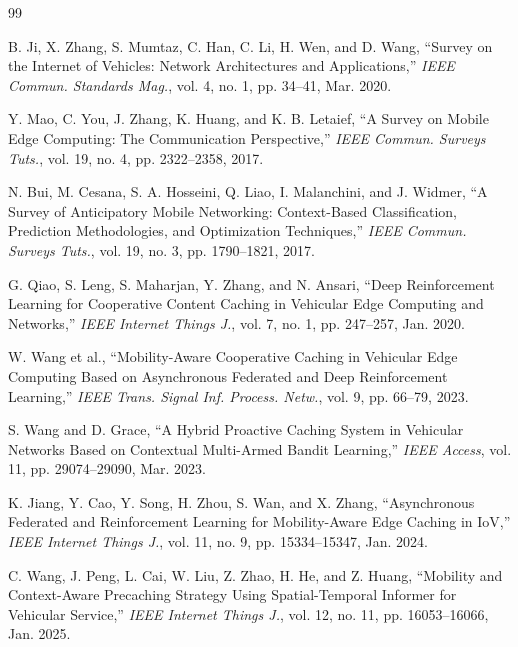 \documentclass[journal]{IEEEtran}
\begin{document}
\begin{thebibliography}{99}

 B. Ji, X. Zhang, S. Mumtaz, C. Han, C. Li, H. Wen, and D. Wang, ``Survey on the Internet of Vehicles: Network Architectures and Applications,'' \emph{IEEE Commun. Standards Mag.}, vol. 4, no. 1, pp. 34--41, Mar. 2020.

 Y. Mao, C. You, J. Zhang, K. Huang, and K. B. Letaief, ``A Survey on Mobile Edge Computing: The Communication Perspective,'' \emph{IEEE Commun. Surveys Tuts.}, vol. 19, no. 4, pp. 2322--2358, 2017.

 N. Bui, M. Cesana, S. A. Hosseini, Q. Liao, I. Malanchini, and J. Widmer, ``A Survey of Anticipatory Mobile Networking: Context-Based Classification, Prediction Methodologies, and Optimization Techniques,'' \emph{IEEE Commun. Surveys Tuts.}, vol. 19, no. 3, pp. 1790--1821, 2017.

 G. Qiao, S. Leng, S. Maharjan, Y. Zhang, and N. Ansari, ``Deep Reinforcement Learning for Cooperative Content Caching in Vehicular Edge Computing and Networks,'' \emph{IEEE Internet Things J.}, vol. 7, no. 1, pp. 247--257, Jan. 2020.

 W. Wang et al., ``Mobility-Aware Cooperative Caching in Vehicular Edge Computing Based on Asynchronous Federated and Deep Reinforcement Learning,'' \emph{IEEE Trans. Signal Inf. Process. Netw.}, vol. 9, pp. 66--79, 2023.

 S. Wang and D. Grace, ``A Hybrid Proactive Caching System in Vehicular Networks Based on Contextual Multi-Armed Bandit Learning,'' \emph{IEEE Access}, vol. 11, pp. 29074--29090, Mar. 2023.

 K. Jiang, Y. Cao, Y. Song, H. Zhou, S. Wan, and X. Zhang, ``Asynchronous Federated and Reinforcement Learning for Mobility-Aware Edge Caching in IoV,'' \emph{IEEE Internet Things J.}, vol. 11, no. 9, pp. 15334--15347, Jan. 2024.

 C. Wang, J. Peng, L. Cai, W. Liu, Z. Zhao, H. He, and Z. Huang, ``Mobility and Context-Aware Precaching Strategy Using Spatial-Temporal Informer for Vehicular Service,'' \emph{IEEE Internet Things J.}, vol. 12, no. 11, pp. 16053--16066, Jan. 2025.


\end{thebibliography}
\end{document}
